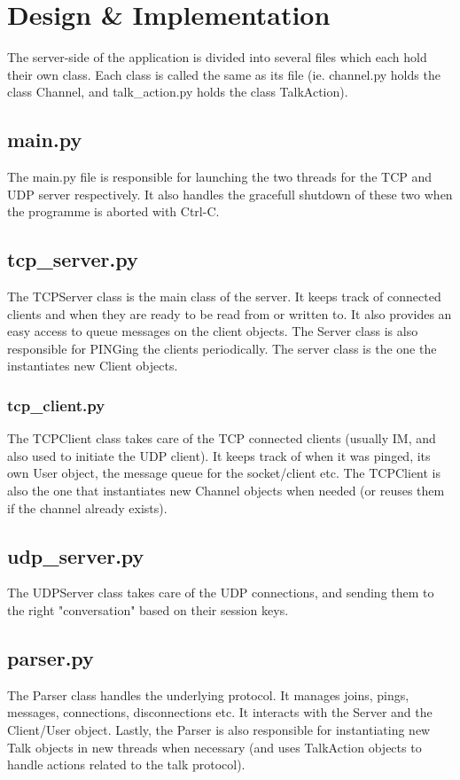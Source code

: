 \documentclass[12pt]{rapport}
\begin{document}
\section*{Design \& Implementation}
The server-side of the application is divided into several files which
each hold their own class. Each class is called the same as its file
(ie. channel.py holds the class Channel, and talk\_action.py holds the
class TalkAction).

\subsection*{main.py}
The main.py file is responsible for launching the two threads for the
TCP and UDP server respectively. It also handles the gracefull shutdown
of these two when the programme is aborted with Ctrl-C.

\subsection*{tcp\_server.py}
The TCPServer class is the main class of the server. It keeps track of
connected clients and when they are ready to be read from or written
to. It also provides an easy access to queue messages on the client
objects. The Server class is also responsible for PINGing the clients
periodically. The server class is the one the instantiates new Client
objects.

\subsubsection*{tcp\_client.py}
The TCPClient class takes care of the TCP connected clients (usually
IM, and also used to initiate the UDP client). It keeps track of when
it was pinged, its own User object, the message queue for the
socket/client etc. The TCPClient is also the one that instantiates new
Channel objects when needed (or reuses them if the channel already
exists).

\subsection*{udp\_server.py}
The UDPServer class takes care of the UDP connections, and sending them
to the right "conversation" based on their session keys.

\subsection*{parser.py}
The Parser class handles the underlying protocol. It manages joins,
pings, messages, connections, disconnections etc. It interacts with
the Server and the Client/User object. Lastly, the Parser is also
responsible for instantiating new Talk objects in new threads when
necessary (and uses TalkAction objects to handle actions related to
the talk protocol).
\end{document}
